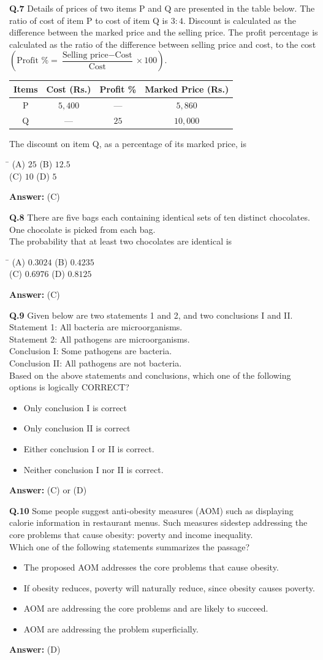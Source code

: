 \documentclass[11pt,a4paper]{article}
\newcommand{\optsfourA}[4]{%
  \begin{tabbing}
    \hspace{0.48\linewidth}\=\kill
    (A) #1 \> (B) #2 \\[2pt]
    (C) #3 \> (D) #4
  \end{tabbing}%
}
\newcommand{\optslistA}[4]{%
  \begin{itemize}
    \setlength{\itemsep}{2pt}\setlength{\parskip}{0pt}
    \item[(A)] #1
    \item[(B)] #2
    \item[(C)] #3
    \item[(D)] #4
  \end{itemize}%
}
\newcommand{\ans}[1]{\textbf{Answer:} #1\par\medskip}
\begin{document}
\textbf{Q.7} Details of prices of two items P and Q are presented in the table below. The ratio of cost of item P to cost of item Q is $3:4$. Discount is calculated as the difference between the marked price and the selling price. The profit percentage is calculated as the ratio of the difference between selling price and cost, to the cost $\left(\text{Profit \%} = \dfrac{\text{Selling price} - \text{Cost}}{\text{Cost}} \times 100\right)$.
\begin{center}
\begin{tabular}{cccc}
\toprule
Items & Cost (Rs.) & Profit \% & Marked Price (Rs.) \\
\midrule
P & $5,400$ & --- & $5,860$ \\
Q & --- & $25$ & $10,000$ \\
\bottomrule
\end{tabular}
\end{center}
The discount on item Q, as a percentage of its marked price, is \underline{\hspace{2cm}}
\optsfourA{$25$}{$12.5$}{$10$}{$5$}
\ans{(C)}

\textbf{Q.8} There are five bags each containing identical sets of ten distinct chocolates. One chocolate is picked from each bag.\\
The probability that at least two chocolates are identical is \underline{\hspace{2cm}}
\optsfourA{$0.3024$}{$0.4235$}{$0.6976$}{$0.8125$}
\ans{(C)}

\textbf{Q.9} Given below are two statements 1 and 2, and two conclusions I and II.\\
Statement 1: All bacteria are microorganisms.\\
Statement 2: All pathogens are microorganisms.\\
Conclusion I: Some pathogens are bacteria.\\
Conclusion II: All pathogens are not bacteria.\\
Based on the above statements and conclusions, which one of the following options is logically CORRECT?
\optslistA{Only conclusion I is correct}{Only conclusion II is correct}{Either conclusion I or II is correct.}{Neither conclusion I nor II is correct.}
\ans{(C) or (D)}

\textbf{Q.10} Some people suggest anti-obesity measures (AOM) such as displaying calorie information in restaurant menus. Such measures sidestep addressing the core problems that cause obesity: poverty and income inequality.\\
Which one of the following statements summarizes the passage?
\optslistA{The proposed AOM addresses the core problems that cause obesity.}{If obesity reduces, poverty will naturally reduce, since obesity causes poverty.}{AOM are addressing the core problems and are likely to succeed.}{AOM are addressing the problem superficially.}
\ans{(D)}
\end{document}

